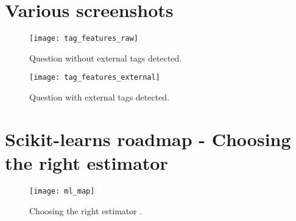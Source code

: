 				
\clearpage
\section{Various screenshots}
\label{app:various_screenshots}
\begin{figure}[ht]
	\centering
	\texttt{[image: tag\_features\_raw]}
	\caption{Question without external tags detected.}
	\label{fig:tag_features_raw}
\end{figure}
\begin{figure}[ht]
	\centering
	\texttt{[image: tag\_features\_external]}
	\caption{Question with external tags detected.}
	\label{fig:tag_features_external}
\end{figure}

\clearpage
\section{Scikit-learns roadmap - Choosing the right estimator}
\label{app:ml_map}
\begin{figure}[ht]
	\centering
	\texttt{[image: ml\_map]}
	\caption[Choosing the right estimator]{Choosing the right estimator \cite{Scikitlearn.org2016i}.}
	\label{fig:ml_map}
\end{figure}

\clearpage
